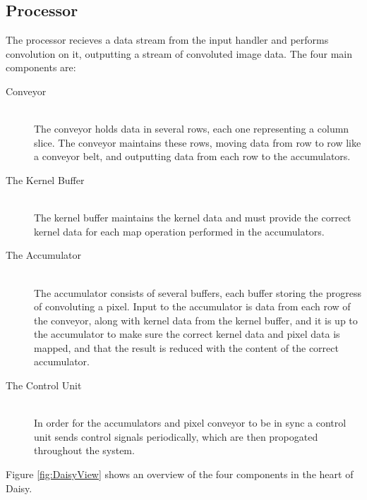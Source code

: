 \begin{Description}
\subsection{Processor}

The processor recieves a data stream from the input handler and performs convolution on it, outputting a stream of convoluted image data.
The four main components are:
\begin{description}
    \item[Conveyor] \hfill\\ 
        The conveyor holds data in several rows, each one representing a column slice. The conveyor maintains these rows, moving data from row to row like a conveyor belt, and outputting data from each row to the accumulators.
    \item[The Kernel Buffer] \hfill\\
        The kernel buffer maintains the kernel data and must provide the correct kernel data for each map operation performed in the accumulators.
    \item[The Accumulator] \hfill\\
        The accumulator consists of several buffers, each buffer storing the progress of convoluting a pixel.
        Input to the accumulator is data from each row of the conveyor, along with kernel data from the kernel buffer, and it is up to the accumulator to make sure the correct kernel data and pixel data is mapped, and that the result is reduced with the content of the correct accumulator.
    \item[The Control Unit] \hfill\\
        In order for the accumulators and pixel conveyor to be in sync a control unit sends control signals periodically, which are then propogated throughout the system.
\end{description}

Figure \ref{fig:DaisyView} shows an overview of the four components in the heart of Daisy. 


\end{Description}
